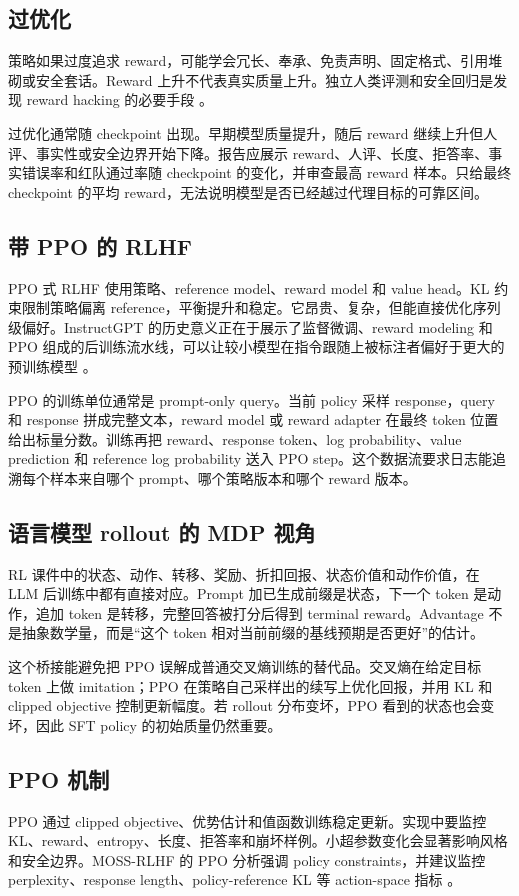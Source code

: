 \documentclass[UTF8,zihao=-4,openany]{ctexbook}
\begin{document}
\subsection{过优化}
策略如果过度追求 reward，可能学会冗长、奉承、免责声明、固定格式、引用堆砌或安全套话。Reward 上升不代表真实质量上升。独立人类评测和安全回归是发现 reward hacking 的必要手段 \cite{casper2023open}。

过优化通常随 checkpoint 出现。早期模型质量提升，随后 reward 继续上升但人评、事实性或安全边界开始下降。报告应展示 reward、人评、长度、拒答率、事实错误率和红队通过率随 checkpoint 的变化，并审查最高 reward 样本。只给最终 checkpoint 的平均 reward，无法说明模型是否已经越过代理目标的可靠区间。

\subsection{带 PPO 的 RLHF}
PPO 式 RLHF 使用策略、reference model、reward model 和 value head。KL 约束限制策略偏离 reference，平衡提升和稳定。它昂贵、复杂，但能直接优化序列级偏好。InstructGPT 的历史意义正在于展示了监督微调、reward modeling 和 PPO 组成的后训练流水线，可以让较小模型在指令跟随上被标注者偏好于更大的预训练模型 \cite{ouyang2022training}。

PPO 的训练单位通常是 prompt-only query。当前 policy 采样 response，query 和 response 拼成完整文本，reward model 或 reward adapter 在最终 token 位置给出标量分数。训练再把 reward、response token、log probability、value prediction 和 reference log probability 送入 PPO step。这个数据流要求日志能追溯每个样本来自哪个 prompt、哪个策略版本和哪个 reward 版本。

\subsection{语言模型 rollout 的 MDP 视角}
RL 课件中的状态、动作、转移、奖励、折扣回报、状态价值和动作价值，在 LLM 后训练中都有直接对应。Prompt 加已生成前缀是状态，下一个 token 是动作，追加 token 是转移，完整回答被打分后得到 terminal reward。Advantage 不是抽象数学量，而是“这个 token 相对当前前缀的基线预期是否更好”的估计。

这个桥接能避免把 PPO 误解成普通交叉熵训练的替代品。交叉熵在给定目标 token 上做 imitation；PPO 在策略自己采样出的续写上优化回报，并用 KL 和 clipped objective 控制更新幅度。若 rollout 分布变坏，PPO 看到的状态也会变坏，因此 SFT policy 的初始质量仍然重要。

\subsection{PPO 机制}
PPO 通过 clipped objective、优势估计和值函数训练稳定更新。实现中要监控 KL、reward、entropy、长度、拒答率和崩坏样例。小超参数变化会显著影响风格和安全边界。MOSS-RLHF 的 PPO 分析强调 policy constraints，并建议监控 perplexity、response length、policy-reference KL 等 action-space 指标 \cite{zheng2023secrets}。
\end{document}
